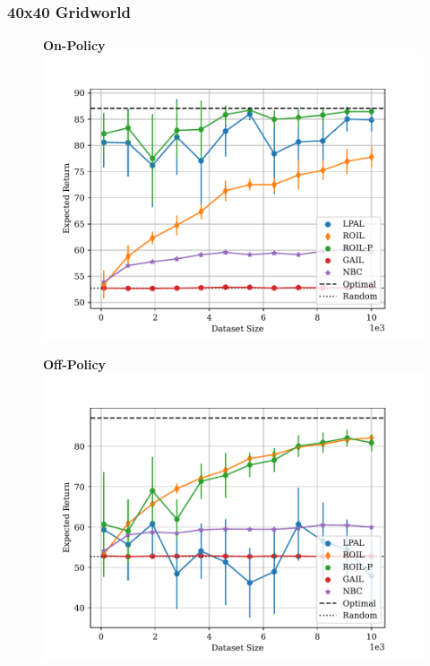 \documentclass{beamer}
\begin{document}
\begin{frame}
\frametitle{40x40 Gridworld}

\begin{figure}
  \begin{center}
  \begin{minipage}{0.45\linewidth}
    \centering
    \textbf{On-Policy}
    \includegraphics[width=\linewidth]{../../pres_roil/plots/returns/40x40_gridworld_on_policy_returns.pdf}
  \end{minipage}
  \hspace{0.05\linewidth}
  \begin{minipage}{0.45\linewidth}
    \centering
    \textbf{Off-Policy}
    \includegraphics[width=\linewidth]{../../pres_roil/plots/returns/40x40_gridworld_off_policy_returns.pdf}
  \end{minipage}
  \end{center}
\end{figure}
\end{frame}
\end{document}
